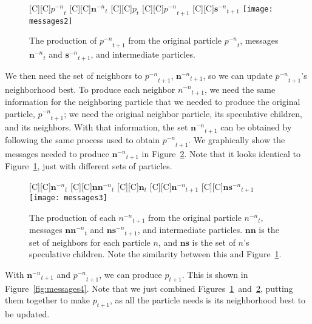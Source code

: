 \documentclass[smallcondensed]{svjour3}
\newcommand{\fig}[1]{Figure~\ref{fig:#1}}
\providecommand{\nonbest}[1]{\ensuremath{#1^{-n}}}
\providecommand{\p}{\ensuremath{p}}
\providecommand{\sset}{\ensuremath{\mathbf{s}}}
\providecommand{\nsset}{\ensuremath{\mathbf{ns}}}
\providecommand{\n}{\ensuremath{n}}
\providecommand{\nset}{\ensuremath{\mathbf{n}}}
\providecommand{\nnset}{\ensuremath{\mathbf{nn}}}
\begin{document}
\begin{figure}
  \centering
  [C][C]{$\nonbest{\p}_{t}$}
  [C][C]{$\nonbest{\nset}_{t}$}
  [C][C]{$\p_{t}$}
  [C][C]{$\nonbest{\p}_{t+1}$}
  [C][C]{$\nonbest{\sset}_{t+1}$}
  \texttt{[image: messages2]}
  \caption{The production of $\nonbest{\p}_{t+1}$ from the original particle 
  $\nonbest{\p}_{t}$, messages $\nonbest{\nset}_{t}$ and
  $\nonbest{\sset}_{t+1}$, and intermediate particles.}
  \label{fig:messages2}
\end{figure}

We then need the set of neighbors to $\nonbest{\p}_{t+1}$,
$\nonbest{\nset}_{t+1}$, so we can update $\nonbest{\p}_{t+1}$'s neighborhood
best.  To produce each neighbor $\nonbest{\n}_{t+1}$, we need the same
information for the neighboring particle that we needed to produce the original
particle, $\nonbest{\p}_{t+1}$; we need the original neighbor particle, its
speculative children, and its neighbors.  With that information, the set
$\nonbest{\nset}_{t+1}$ can be obtained by following the same process used to
obtain $\nonbest{\p}_{t+1}$.  We graphically show the messages needed to
produce $\nonbest{\nset}_{t+1}$ in \fig{messages3}.  Note that it looks
identical to \fig{messages2}, just with different sets of particles.

\begin{figure}
  \centering
  [C][C]{$\nonbest{\nset}_{t}$}
  [C][C]{$\nonbest{\nnset}_{t}$}
  [C][C]{$\nset_{t}$}
  [C][C]{$\nonbest{\nset}_{t+1}$}
  [C][C]{$\nonbest{\nsset}_{t+1}$}
  \texttt{[image: messages3]}
  \caption{The production of each $\nonbest{\n}_{t+1}$ from the original
  particle $\nonbest{\n}_{t}$, messages $\nonbest{\nnset}_{t}$ and
  $\nonbest{\nsset}_{t+1}$, and intermediate particles.  $\nnset$ is the set of
  neighbors for each particle $\n$, and $\nsset$ is the set of $\n$'s
  speculative children.  Note the similarity between this and \fig{messages2}.}
  \label{fig:messages3}
\end{figure}

With $\nonbest{\nset}_{t+1}$ and $\nonbest{\p}_{t+1}$, we can produce
$\p_{t+1}$.  This is shown in \fig{messages4}.  Note that we just combined
Figures~\ref{fig:messages2}~and~\ref{fig:messages3}, putting them together
to make $\p_{t+1}$, as all the particle needs is its neighborhood best to be
updated.
\end{document}
